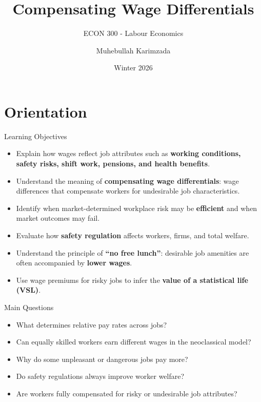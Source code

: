 \documentclass[aspectratio=169]{beamer}
\title{\textbf{Compensating Wage Differentials \vspace{.5cm}\\  }}
\subtitle{{\large ECON 300 - Labour Economics}}
\author{Muhebullah Karimzada}
\date{Winter 2026}
\begin{document}
\begin{frame}[plain]
  \titlepage
\end{frame}

\section{Orientation}

\begin{frame}{Learning Objectives}
\transfade
\begin{itemize}
  \item Explain how wages reflect job attributes such as \textbf{working conditions, safety risks, shift work, pensions, and health benefits}.
  \item Understand the meaning of \textbf{compensating wage differentials}: wage differences that compensate workers for undesirable job characteristics.
  \item Identify when market-determined workplace risk may be \textbf{efficient} and when market outcomes may fail.
  \item Evaluate how \textbf{safety regulation} affects workers, firms, and total welfare.
  \item Understand the principle of \textbf{``no free lunch''}: desirable job amenities are often accompanied by \textbf{lower wages}.
  \item Use wage premiums for risky jobs to infer the \textbf{value of a statistical life (VSL)}.
\end{itemize}
\end{frame}

\begin{frame}{Main Questions}
\transfade
\begin{itemize}
  \item What determines relative pay rates across jobs?
  \item Can equally skilled workers earn different wages in the neoclassical model?
  \item Why do some unpleasant or dangerous jobs pay more?
  \item Do safety regulations always improve worker welfare?
  \item Are workers fully compensated for risky or undesirable job attributes?
\end{itemize}
\end{frame}
\end{document}
